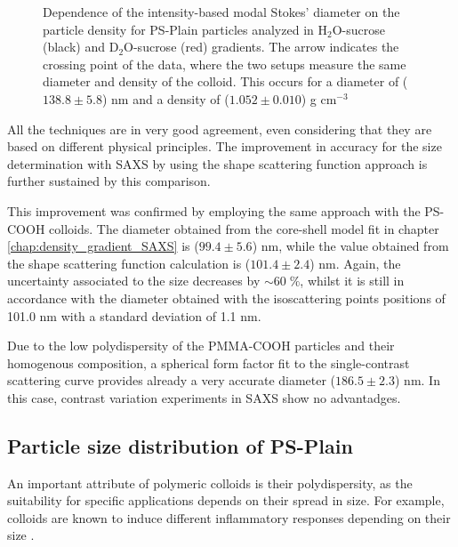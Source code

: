 \begin{figure}
	\begin{center}
		
	\end{center}
	\caption[Simultaneous size and density determination of PS-Plain with a DCS combined approach.]{Dependence of the intensity-based modal Stokes' diameter on the particle density for PS-Plain particles analyzed in H$_2$O-sucrose (black) and D$_2$O-sucrose (red) gradients. The arrow indicates the crossing point of the data, where the two setups measure the same diameter and density of the colloid. This occurs for a diameter of ($138.8\pm5.8$) nm and a density of ($1.052\pm0.010$) g cm$^{-3}$}
	\label{fig:DCSCombinedStokes}
\end{figure}
 
All the techniques are in very good agreement, even considering that they are based on different physical principles. The improvement in accuracy for the size determination with SAXS by using the shape scattering function approach is further sustained by this comparison. 

This improvement was confirmed by employing the same approach with the PS-COOH colloids. The diameter obtained from the core-shell model fit in chapter \ref{chap:density_gradient_SAXS} is ($99.4\pm5.6$) nm, while the value obtained from the shape scattering function calculation is ($101.4\pm2.4$) nm. Again, the uncertainty associated to the size decreases by $\sim 60\;\%$, whilst it is still in accordance with the diameter obtained with the isoscattering points positions of 101.0 nm with a standard deviation of 1.1 nm. 

Due to the low polydispersity of the PMMA-COOH particles and their homogenous composition, a spherical form factor fit to the single-contrast scattering curve provides already a very accurate diameter ($186.5\pm2.3$) nm. In this case, contrast variation experiments in SAXS show no advantadges.

\subsection{Particle size distribution of PS-Plain}

An important attribute of polymeric colloids is their polydispersity, as the suitability for specific applications depends on their spread in size. For example, colloids are known to induce different inflammatory responses depending on their size \citep{kusaka_effect_2014}.

